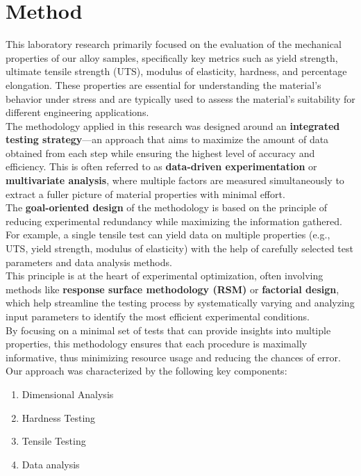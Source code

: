 \documentclass{article}
\begin{document}
\section{Method}
This laboratory research primarily focused on the evaluation of the mechanical properties of our alloy samples, specifically key metrics such as yield strength, ultimate tensile strength (UTS), modulus of elasticity, hardness, and percentage elongation. These properties are essential for understanding the material's behavior under stress and are typically used to assess the material’s suitability for different engineering applications.\\[8pt]
The methodology applied in this research was designed around an \textbf{integrated testing strategy}—an approach that aims to maximize the amount of data obtained from each step while ensuring the highest level of accuracy and efficiency. This is often referred to as \textbf{data-driven experimentation} or \textbf{multivariate analysis}, where multiple factors are measured simultaneously to extract a fuller picture of material properties with minimal effort.\\[8pt]
The \textbf{goal-oriented design} of the methodology is based on the principle of reducing experimental redundancy while maximizing the information gathered. For example, a single tensile test can yield data on multiple properties (e.g., UTS, yield strength, modulus of elasticity) with the help of carefully selected test parameters and data analysis methods.\\[8pt]
This principle is at the heart of experimental optimization, often involving methods like \textbf{response surface methodology (RSM)} or \textbf{factorial design}, which help streamline the testing process by systematically varying and analyzing input parameters to identify the most efficient experimental conditions.\\[8pt]
By focusing on a minimal set of tests that can provide insights into multiple properties, this methodology ensures that each procedure is maximally informative, thus minimizing resource usage and reducing the chances of error.\\[8pt]
Our approach was characterized by the following key components:
\begin{enumerate}[itemsep=-0.5mm]
    \item {Dimensional Analysis}
    \item {Hardness Testing}
    \item {Tensile Testing} 
    \item {Data analysis}
\end{enumerate}
\end{document}
